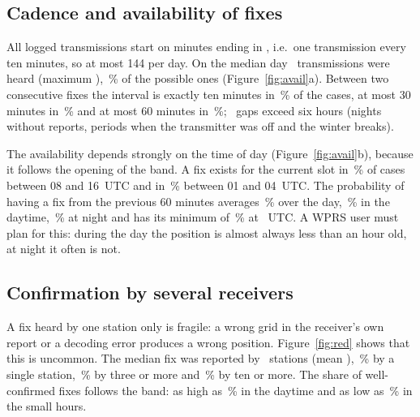 \documentclass[10pt,a4paper]{article}
\begin{document}
\subsection{Cadence and availability of fixes}
All logged transmissions start on minutes ending in \wMinuteOnly, i.e.\ one transmission every ten minutes, so at most 144 per day. On the median day \wPerDayMed\ transmissions were heard (maximum \wPerDayMax), \wHeardPct\,\% of the possible ones (Figure~\ref{fig:avail}a). Between two consecutive fixes the interval is exactly ten minutes in \wGapBA\,\% of the cases, at most 30 minutes in \wGapDA\,\% and at most 60 minutes in \wGapGA\,\%; \wGapGh\ gaps exceed six hours (nights without reports, periods when the transmitter was off and the winter breaks).

The availability depends strongly on the time of day (Figure~\ref{fig:avail}b), because it follows the opening of the band. A fix exists for the current slot in \wAvSlotDay\,\% of cases between 08 and 16~UTC and in \wAvSlotNight\,\% between 01 and 04~UTC. The probability of having a fix from the previous 60 minutes averages \wAvGAAvg\,\% over the day, \wAvDayGA\,\% in the daytime, \wAvNightGA\,\% at night and has its minimum of \wAvGAMin\,\% at \wAvGAMinH~UTC. A WPRS user must plan for this: during the day the position is almost always less than an hour old, at night it often is not.


\subsection{Confirmation by several receivers}
A fix heard by one station only is fragile: a wrong grid in the receiver's own report or a decoding error produces a wrong position. Figure~\ref{fig:red} shows that this is uncommon. The median fix was reported by \wRepMed\ stations (mean \wRepMean), \wRepB\,\% by a single station, \wRepD\,\% by three or more and \wRepBA\,\% by ten or more. The share of well-confirmed fixes follows the band: as high as \wRepDMax\,\% in the daytime and as low as \wRepDMin\,\% in the small hours.

\end{document}
